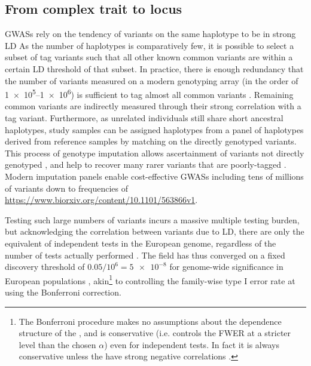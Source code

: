 \begin{outline}
\subsection{From complex trait to locus}

\glspl{GWAS} rely on the tendency of variants on the same haplotype to be in strong \gls{LD}
As the number of haplotypes is comparatively few, 
it is possible to select a subset of tag variants such that all other known common variants are within a certain \gls{LD} threshold of that subset. 
In practice, there is enough redundancy that the number of variants measured on a modern genotyping array (in the order of \numrange[retain-unity-mantissa=false]{1e5}{1e6}) is sufficient to tag almost all common variants  \autocite{theinternationalhapmapconsortium2005HaplotypeMapHuman,barrett2006EvaluatingCoverageGenomewide}.
Remaining common variants are indirectly measured through their strong correlation with a tag variant.
Furthermore, as unrelated individuals still share short ancestral haplotypes, 
study samples can be assigned haplotypes from a panel of haplotypes derived from reference samples by matching on the directly genotyped variants.
This process of genotype imputation allows ascertainment of variants not directly genotyped \autocite{das2018GenotypeImputationLarge},
and help to recover many rarer variants that are poorly-tagged \autocite{visscher201710YearsGWAS}.
Modern imputation panels enable cost-effective \glspl{GWAS} including tens of millions of variants down to frequencies of  \url{https://www.biorxiv.org/content/10.1101/563866v1}.

Testing such large numbers of variants incurs a massive multiple testing burden, but acknowledging the correlation between variants due to \gls{LD},
there are only the equivalent of  independent tests in the European genome, regardless of the number of tests actually performed \autocite{peer2008EstimationMultipleTesting}.
The field has thus converged on a fixed discovery threshold of $0.05 / 10^6 = \num{5e-8}$ for genome-wide significance in European populations \autocite{jannot2015108HasEmerged}, akin\footnote{
    The Bonferroni procedure makes no assumptions about the dependence structure of the \pvalues, and is conservative (i.e. controls the \gls{FWER} at a stricter level than the chosen $\alpha$) even for independent tests. In fact it is always conservative unless the \pvalues have strong negative correlations \autocite{goeman2014MultipleHypothesisTesting}.
}
to controlling the family-wise type I error rate at using the Bonferroni correction.


\end{outline}
